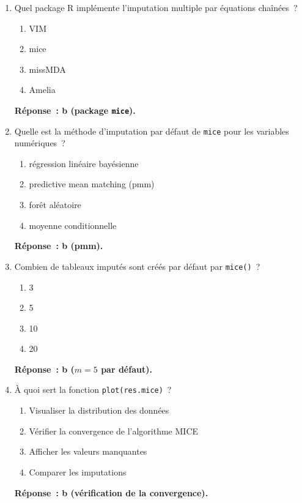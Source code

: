 \documentclass[a4paper,11pt]{article}
\theoremstyle{definition}
\theoremstyle{remark}
\begin{document}

\begin{enumerate}

  \item Quel package R impl\'emente l'imputation multiple par
    \'equations cha\^{i}n\'ees~?
    \begin{enumerate}
      \item VIM
      \item mice
      \item missMDA
      \item Amelia
    \end{enumerate}
    \textbf{R\'eponse~: b (package \texttt{mice}).}

  \item Quelle est la m\'ethode d'imputation par d\'efaut de
    \texttt{mice} pour les variables num\'eriques~?
    \begin{enumerate}
      \item r\'egression lin\'eaire bay\'esienne
      \item predictive mean matching (pmm)
      \item for\^et al\'eatoire
      \item moyenne conditionnelle
    \end{enumerate}
    \textbf{R\'eponse~: b (pmm).}

  \item Combien de tableaux imput\'es sont cr\'e\'es par d\'efaut
    par \texttt{mice()}~?
    \begin{enumerate}
      \item 3
      \item 5
      \item 10
      \item 20
    \end{enumerate}
    \textbf{R\'eponse~: b ($m = 5$ par d\'efaut).}

  \item \`A quoi sert la fonction \texttt{plot(res.mice)}~?
    \begin{enumerate}
      \item Visualiser la distribution des donn\'ees
      \item V\'erifier la convergence de l'algorithme MICE
      \item Afficher les valeurs manquantes
      \item Comparer les imputations
    \end{enumerate}
    \textbf{R\'eponse~: b (v\'erification de la convergence).}


\end{enumerate}
\end{document}
